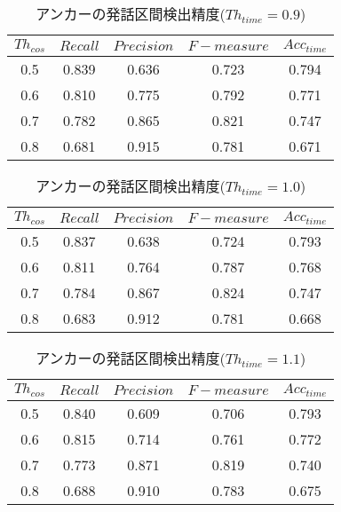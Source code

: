 \begin{table}[H]
  \begin{center}
    \caption{アンカーの発話区間検出精度($Th_{time}=0.9$) \label{table:result_get_anchor09}}
    \begin{tabular}{|c||c|c|c|c|} \hline
      $Th_{cos}$ & $Recall$ & $Precision$ & $F-measure$ & $Acc_{time}$\\ \hline
0.5 & 0.839 & 0.636 & 0.723 & 0.794 \\ \hline
0.6 & 0.810 & 0.775 & 0.792 & 0.771 \\ \hline
0.7 & 0.782 & 0.865 & 0.821 & 0.747 \\ \hline
0.8 & 0.681 & 0.915 & 0.781 & 0.671 \\ \hline

    \end{tabular}
  \end{center}
\end{table}

\begin{table}[H]
  \begin{center}
    \caption{アンカーの発話区間検出精度($Th_{time}=1.0$) \label{table:result_get_anchor10}}
    \begin{tabular}{|c||c|c|c|c|} \hline
      $Th_{cos}$ & $Recall$ & $Precision$ & $F-measure$ & $Acc_{time}$\\ \hline
0.5 & 0.837 & 0.638 & 0.724 & 0.793 \\ \hline
0.6 & 0.811 & 0.764 & 0.787 & 0.768 \\ \hline
0.7 & 0.784 & 0.867 & 0.824 & 0.747 \\ \hline
0.8 & 0.683 & 0.912 & 0.781 & 0.668 \\ \hline

    \end{tabular}
  \end{center}
\end{table}

\begin{table}[H]
  \begin{center}
    \caption{アンカーの発話区間検出精度($Th_{time}=1.1$) \label{table:result_get_anchor11}}
    \begin{tabular}{|c||c|c|c|c|} \hline
      $Th_{cos}$ & $Recall$ & $Precision$ & $F-measure$ & $Acc_{time}$\\ \hline
0.5 & 0.840 & 0.609 & 0.706 & 0.793 \\ \hline
0.6 & 0.815 & 0.714 & 0.761 & 0.772 \\ \hline
0.7 & 0.773 & 0.871 & 0.819 & 0.740 \\ \hline
0.8 & 0.688 & 0.910 & 0.783 & 0.675 \\ \hline

    \end{tabular}
  \end{center}
\end{table}


